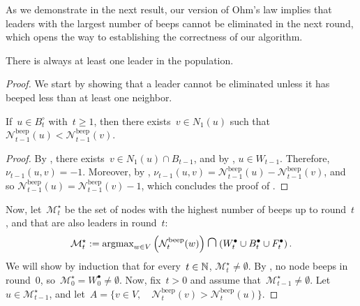 \documentclass{article}
\newcommand{\inote}[1]{{\color{blue} ({\bf Isa:} #1)}}
\newcommand{\lead}{\bullet}
\newcommand{\nlead}{\circ}
\newcommand{\beepcount}{\mathcal{N}^{\mathrm{beep}}}
\newcommand{\master}{\mathcal{M}^\star}
\begin{document}

As we demonstrate in the next result, our version of Ohm's law implies that leaders with the largest number of beeps cannot be eliminated in the next round, which opens the way to establishing the correctness of our algorithm.

\begin{lemma} \label{lemma:no_leader_extinction}
    There is always at least one leader in the population.
\end{lemma}
\begin{proof}
    We start by showing that a leader cannot be eliminated unless it has beeped less than at least one neighbor.
    
    \begin{claim} \label{lemma:elimination_condition}
        If~$u \in B_t^\nlead$ with~$t \geq 1$, then there exists~$v \in N_1(u)$ such that~$\beepcount_{t-1}(u) < \beepcount_{t-1}(v)$.
    \end{claim}
    \begin{proof}
        By , there exists~$v \in N_1(u) \cap B_{t-1}$, and by , $u \in W_{t-1}$. Therefore, $\nu_{t-1}(u,v) = -1$.
        Moreover, by , 
        $\nu_{t-1}(u,v) = \beepcount_{t-1}(u) - \beepcount_{t-1}(v)$, and so    
        $\beepcount_{t-1}(u) = \beepcount_{t-1}(v) - 1$, which concludes the proof of .
    \end{proof}

    Now, let~$\master_t$ be the set of nodes with the highest number of beeps up to round~$t$, and that are also leaders in round~$t$:
    \begin{equation*}
        \master_t := \argmax_{w \in V} \pa{ \beepcount_t(w) } \medcap \pa{W_t^\lead \cup B_t^\lead \cup F_t^\lead}.
    \end{equation*}
    We will show by induction that for every~$t \in \operatorname{\mathbb{N}}$, $\master_t \neq \emptyset$.
    By , no node beeps in round~$0$, so~$\master_0 = W_0^\lead \neq \emptyset$. Now, fix~$t > 0$ and assume that~$\master_{t-1} \neq \emptyset$.
    Let~$u \in \master_{t-1}$, and let~$A = \{v \in V, \quad \beepcount_{t}(v) > \beepcount_{t}(u)\}$.


\end{proof}
\end{document}
